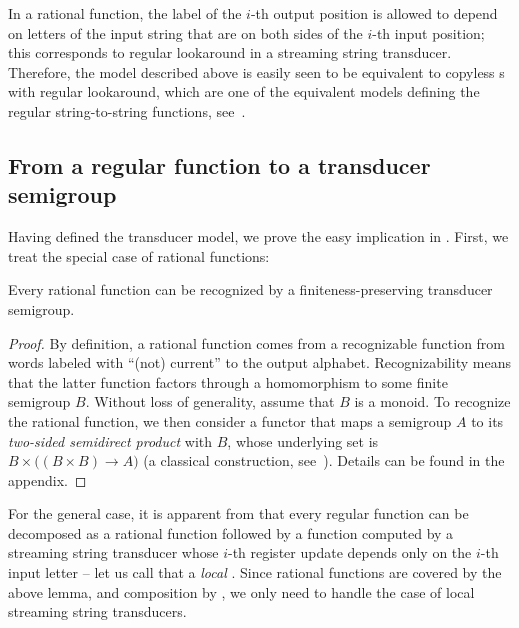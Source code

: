 In a rational function, the label of the $i$-th output position is allowed to depend on letters of the input string that are on both sides of the $i$-th input position; this corresponds to regular lookaround in a streaming string transducer. Therefore, the model described above is easily seen to be equivalent to copyless \sst{}s with regular lookaround, which are one of the equivalent models defining the regular string-to-string functions, see~\cite[Section~IV.C]{AlurFT12}.

\subsection{From a regular function to a transducer semigroup}
\label{sec:easy}

Having defined the transducer model, we prove the easy implication in
. First, we treat the special case of rational
functions:
\begin{lemma}\label{lem:rational-to-functor}
  Every rational function can be recognized by a finiteness-preserving
  transducer semigroup.
\end{lemma}
\begin{proof}
  By definition, a rational function comes from a recognizable function from
  words labeled with \enquote{(not) current} to the output alphabet.
  Recognizability means that the latter function factors through a homomorphism
  to some finite semigroup $B$. Without loss of generality, assume that $B$ is a
  monoid. To recognize the rational function, we then consider a functor that
  maps a semigroup $A$ to its \emph{two-sided semidirect product} with $B$,
  whose underlying set is $B \times \big((B \times B) \to A\big)$ (a classical
  construction, see~\cite[Section 6]{rhodes1989kernel}). Details can be found in
  the appendix.
\end{proof}

For the general case, it is apparent from  that every
regular function can be decomposed as a rational function followed by a function
computed by a streaming string transducer whose $i$-th register update depends
only on the $i$-th input letter -- let us call that a \emph{local} \sst. Since
rational functions are covered by the above lemma, and composition by
, we only need to handle the case of local streaming
string transducers.

